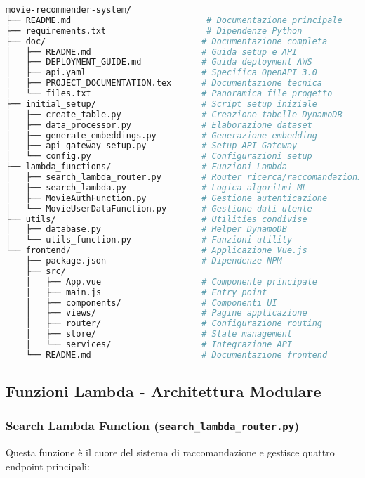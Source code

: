 \documentclass[11pt,a4paper]{article}
\begin{document}
\begin{lstlisting}[language=bash]
movie-recommender-system/
├── README.md                           # Documentazione principale
├── requirements.txt                    # Dipendenze Python
├── doc/                               # Documentazione completa
│   ├── README.md                      # Guida setup e API
│   ├── DEPLOYMENT_GUIDE.md            # Guida deployment AWS
│   ├── api.yaml                       # Specifica OpenAPI 3.0
│   ├── PROJECT_DOCUMENTATION.tex      # Documentazione tecnica
│   └── files.txt                      # Panoramica file progetto
├── initial_setup/                     # Script setup iniziale
│   ├── create_table.py                # Creazione tabelle DynamoDB
│   ├── data_processor.py              # Elaborazione dataset
│   ├── generate_embeddings.py         # Generazione embedding
│   ├── api_gateway_setup.py           # Setup API Gateway
│   └── config.py                      # Configurazioni setup
├── lambda_functions/                  # Funzioni Lambda
│   ├── search_lambda_router.py        # Router ricerca/raccomandazioni
│   ├── search_lambda.py               # Logica algoritmi ML
│   ├── MovieAuthFunction.py           # Gestione autenticazione
│   └── MovieUserDataFunction.py       # Gestione dati utente
├── utils/                             # Utilities condivise
│   ├── database.py                    # Helper DynamoDB
│   └── utils_function.py              # Funzioni utility
└── frontend/                          # Applicazione Vue.js
    ├── package.json                   # Dipendenze NPM
    ├── src/
    │   ├── App.vue                    # Componente principale
    │   ├── main.js                    # Entry point
    │   ├── components/                # Componenti UI
    │   ├── views/                     # Pagine applicazione
    │   ├── router/                    # Configurazione routing
    │   ├── store/                     # State management
    │   └── services/                  # Integrazione API
    └── README.md                      # Documentazione frontend
\end{lstlisting}

\subsection{Funzioni Lambda - Architettura Modulare}

\subsubsection{Search Lambda Function (\texttt{search\_lambda\_router.py})}
Questa funzione è il cuore del sistema di raccomandazione e gestisce quattro endpoint principali:
\end{document}
